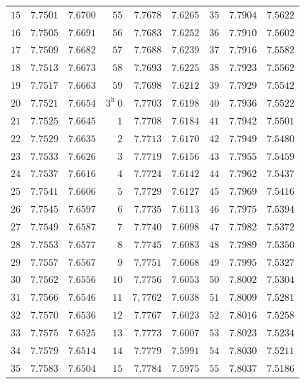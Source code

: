 \begin{center}
{{\begin{minipage}{.83\linewidth}
\begin{tabular}{r|r|r||r|r|r||r|r|r}
$15$ & $7.7501$ & $7.6700$ & $55$ & $7.7678$ & $7.6265$ & $35$ & $7.7904$ & $7.5622$\\[1.15pt]
$16$ & $7.7505$ & $7.6691$ & $56$ & $7.7683$ & $7.6252$ & $36$ & $7.7910$ & $7.5602$\\
$17$ & $7.7509$ & $7.6682$ & $57$ & $7.7688$ & $7.6239$ & $37$ & $7.7916$ & $7.5582$\\
$18$ & $7.7513$ & $7.6673$ & $58$ & $7.7693$ & $7.6225$ & $38$ & $7.7923$ & $7.5562$\\
$19$ & $7.7517$ & $7.6663$ & $59$ & $7.7698$ & $7.6212$ & $39$ & $7.7929$ & $7.5542$\\
$20$ & $7.7521$ & $7.6654$ & $3^{\mathrm h}\ 0$ & $7.7703$ & $7.6198$ & $40$ & $7.7936$ & $7.5522$\\[1.15pt]
$21$ & $7.7525$ & $7.6645$ & $1$ & $7.7708$ & $7.6184$ & $41$ & $7.7942$ & $7.5501$\\
$22$ & $7.7529$ & $7.6635$ & $2$ & $7.7713$ & $7.6170$ & $42$ & $7.7949$ & $7.5480$\\
$23$ & $7.7533$ & $7.6626$ & $3$ & $7.7719$ & $7.6156$ & $43$ & $7.7955$ & $7.5459$\\
$24$ & $7.7537$ & $7.6616$ & $4$ & $7.7724$ & $7.6142$ & $44$ & $7.7962$ & $7.5437$\\
$25$ & $7.7541$ & $7.6606$ & $5$ & $7.7729$ & $7.6127$ & $45$ & $7.7969$ & $7.5416$\\[1.15pt]
$26$ & $7.7545$ & $7.6597$ & $6$ & $7.7735$ & $7.6113$ & $46$ & $7.7975$ & $7.5394$\\
$27$ & $7.7549$ & $7.6587$ & $7$ & $7.7740$ & $7.6098$ & $47$ & $7.7982$ & $7.5372$\\
$28$ & $7.7553$ & $7.6577$ & $8$ & $7.7745$ & $7.6083$ & $48$ & $7.7989$ & $7.5350$\\
$29$ & $7.7557$ & $7.6567$ & $9$ & $7.7751$ & $7.6068$ & $49$ & $7.7995$ & $7.5327$\\
$30$ & $7.7562$ & $7.6556$ & $10$ & $7.7756$ & $7.6053$ & $50$ & $7.8002$ & $7.5304$\\[1.15pt]
$31$ & $7.7566$ & $7.6546$ & $11$ & $7{,}7762$ & $7.6038$ & $51$ & $7.8009$ & $7.5281$\\
$32$ & $7.7570$ & $7.6536$ & $12$ & $7.7767$ & $7.6023$ & $52$ & $7.8016$ & $7.5258$\\
$33$ & $7.7575$ & $7.6525$ & $13$ & $7.7773$ & $7.6007$ & $53$ & $7.8023$ & $7.5234$\\
$34$ & $7.7579$ & $7.6514$ & $14$ & $7.7779$ & $7.5991$ & $54$ & $7.8030$ & $7.5211$\\
$35$ & $7.7583$ & $7.6504$ & $15$ & $7.7784$ & $7.5975$ & $55$ & $7.8037$ & $7.5186$\\[1.15pt]

\end{tabular}
\end{minipage}}}
\end{center}
